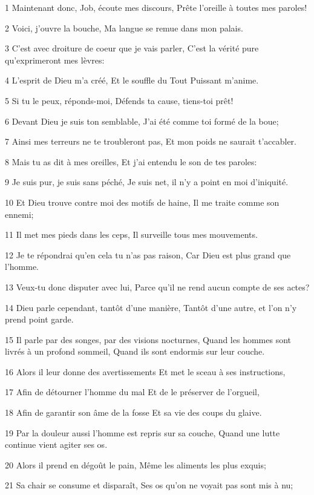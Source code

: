 \par 1 Maintenant donc, Job, écoute mes discours, Prête l'oreille à toutes mes paroles!
\par 2 Voici, j'ouvre la bouche, Ma langue se remue dans mon palais.
\par 3 C'est avec droiture de coeur que je vais parler, C'est la vérité pure qu'exprimeront mes lèvres:
\par 4 L'esprit de Dieu m'a créé, Et le souffle du Tout Puissant m'anime.
\par 5 Si tu le peux, réponds-moi, Défends ta cause, tiens-toi prêt!
\par 6 Devant Dieu je suis ton semblable, J'ai été comme toi formé de la boue;
\par 7 Ainsi mes terreurs ne te troubleront pas, Et mon poids ne saurait t'accabler.
\par 8 Mais tu as dit à mes oreilles, Et j'ai entendu le son de tes paroles:
\par 9 Je suis pur, je suis sans péché, Je suis net, il n'y a point en moi d'iniquité.
\par 10 Et Dieu trouve contre moi des motifs de haine, Il me traite comme son ennemi;
\par 11 Il met mes pieds dans les ceps, Il surveille tous mes mouvements.
\par 12 Je te répondrai qu'en cela tu n'as pas raison, Car Dieu est plus grand que l'homme.
\par 13 Veux-tu donc disputer avec lui, Parce qu'il ne rend aucun compte de ses actes?
\par 14 Dieu parle cependant, tantôt d'une manière, Tantôt d'une autre, et l'on n'y prend point garde.
\par 15 Il parle par des songes, par des visions nocturnes, Quand les hommes sont livrés à un profond sommeil, Quand ils sont endormis sur leur couche.
\par 16 Alors il leur donne des avertissements Et met le sceau à ses instructions,
\par 17 Afin de détourner l'homme du mal Et de le préserver de l'orgueil,
\par 18 Afin de garantir son âme de la fosse Et sa vie des coups du glaive.
\par 19 Par la douleur aussi l'homme est repris sur sa couche, Quand une lutte continue vient agiter ses os.
\par 20 Alors il prend en dégoût le pain, Même les aliments les plus exquis;
\par 21 Sa chair se consume et disparaît, Ses os qu'on ne voyait pas sont mis à nu;
